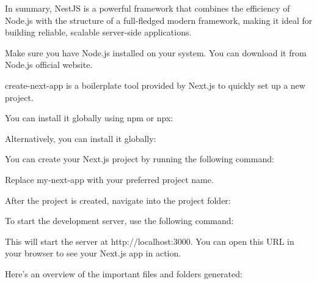 
In summary, NestJS is a powerful framework that combines the efficiency of Node.js with the structure of a full-fledged modern framework, 
making it ideal for building reliable, scalable server-side applications.





Make sure you have Node.js installed on your system. You can download it from Node.js official website.

create-next-app is a boilerplate tool provided by Next.js to quickly set up a new project.

You can install it globally using npm or npx:



Alternatively, you can install it globally:




You can create your Next.js project by running the following command:



Replace my-next-app with your preferred project name.

After the project is created, navigate into the project folder:



To start the development server, use the following command:



This will start the server at http://localhost:3000. You can open this URL in your browser to see your Next.js app in action.


Here's an overview of the important files and folders generated:


